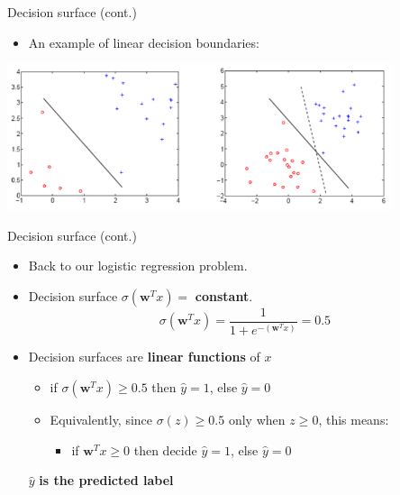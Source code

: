 \documentclass[serif, aspectratio=169]{beamer}
\begin{document}
    \begin{frame}{Decision surface (cont.)}

        \begin{itemize}
            \item An example of linear decision boundaries:
        \end{itemize}
        \begin{center}
            \includegraphics[width=0.85\textwidth]{pic/DBoundary.png}
        \end{center}
    \end{frame}

    \begin{frame}{Decision surface (cont.)}
        \begin{itemize}
            \item Back to our logistic regression problem.
            \item Decision surface $\sigma (\mathbf{w}^Tx) = $ \textbf{constant}.
            \[
                \sigma (\mathbf{w}^Tx) = \frac{1}{1 + e^{-(\mathbf{w}^Tx)}} = 0.5
            \]
            \item Decision surfaces are \textbf{linear functions} of $x$
            \begin{itemize}
                \item if $\sigma (\mathbf{w}^Tx) \geq 0.5$ then $\hat{y}=1$, else $\hat{y} = 0$
                \item Equivalently, since $\sigma(z) \ge 0.5$ only when $z \ge 0$, this means:
                \begin{itemize}
                    \item if $\mathbf{w}^Tx \geq 0$ then decide $\hat{y}=1$, else $\hat{y}=0$
                \end{itemize}
            \end{itemize}%
            \vfill
            \begin{center}
                \( \hat{y} \) \textbf{is the predicted label}
            \end{center}
        \end{itemize}
    \end{frame}
\end{document}
